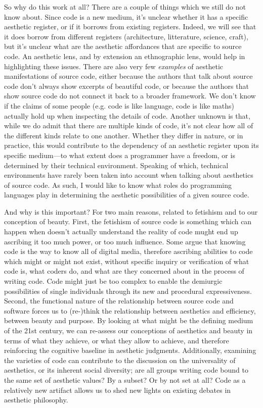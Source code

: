 So why do this work at all? There are a couple of things which we still do not know about. Since code is a new medium, it's unclear whether it has a specific aesthetic register, or if it borrows from existing registers. Indeed, we will see that it does borrow from different registers (architecture, litterature, science, craft), but it's unclear what are the aesthetic affordances that are specific to source code. An aesthetic lens, and by extension an ethnographic lens, would help in highlighting these issues.
There are also very few \emph{examples} of aesthetic manifestations of source code, either because the authors that talk about source code don't always show excerpts of beautiful code, or because the authors that show source code do not connect it back to a broader framework. We don't know if the claims of some people (e.g. code is like language, code is like maths) actually hold up when inspecting the details of code. Another unknown is that, while we do admit that there are multiple kinds of code, it's not clear how all of the different kinds relate to one another. Whether they differ in nature, or in practice, this would contribute to the dependency of an aesthetic register upon its specific medium—to what extent does a programmer have a freedom, or is determined by their technical environment. Speaking of which, technical environments have rarely been taken into account when talking about aesthetics of source code. As such, I would like to know what roles do programming languages play in determining the aesthetic possibilities of a given source code.

And why is this important? For two main reasons, related to fetishism and to our conception of beauty.
First, the fetishism of source code is something which can happen when doesn't actually understand the reality of code mught end up ascribing it too much power, or too much influence. Some argue that knowing code is the way to know all of digital media, therefore ascribing abilities to code which might or might not exist, without specific inquiry or verification of what code is, what coders do, and what are they concerned about in the process of writing code. Code might just be too complex to enable the demiurgic possibilities of single individuals through its new and procedural expressiveness.
Second, the functional nature of the relationship between source code and software forces us to (re-)think the relationship between aesthetics and efficiency, between beauty and purpose. By looking at what might be the defining medium of the 21st century, we can re-assess our conceptions of aesthetics and beauty in terms of what they achieve, or what they allow to achieve, and therefore reinforcing the cognitive baseline in aesthetic judgments. Additionally, examining the varieties of code can contribute to the discussion on the universality of aesthetics, or its inherent social diversity; are all groups writing code bound to the same set of aesthetic values? By a subset? Or by not set at all? Code as a relatively new artifact allows us to shed new lights on existing debates in aesthetic philosophy.

